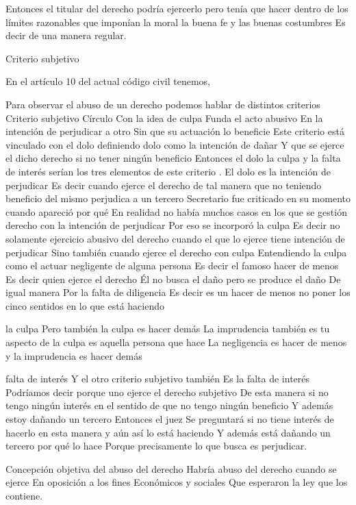 \documentclass[12pt]{book}
\begin{document}
Entonces el titular del derecho podría ejercerlo pero tenía que hacer dentro de los límites razonables que imponían la moral la buena fe y las buenas costumbres Es decir de una manera regular.


Criterio subjetivo

En el artículo 10 del actual código civil tenemos,

Para observar el abuso de un derecho podemos hablar de distintos criterios  Criterio subjetivo  Círculo Con la idea de culpa Funda el acto abusivo En la intención de perjudicar a otro 	Sin que su actuación lo beneficie Este criterio está vinculado con el dolo definiendo dolo como la intención de dañar Y que se ejerce el dicho derecho si no tener ningún beneficio Entonces el dolo la culpa y la falta de interés serían los tres elementos de este criterio .
El dolo 
es la intención de perjudicar Es decir cuando ejerce el derecho de tal manera que no teniendo beneficio del mismo perjudica a un tercero Secretario fue criticado en su momento cuando apareció por qué En realidad no había muchos casos en los que se gestión derecho con la intención de perjudicar Por eso se incorporó la culpa Es decir no solamente ejercicio abusivo del derecho cuando el que lo ejerce tiene intención de perjudicar Sino también cuando ejerce el derecho con culpa Entendiendo la culpa como el actuar negligente de alguna persona Es decir el famoso hacer de menos Es decir quien ejerce el derecho Él no busca el daño pero se produce el daño De igual manera Por la falta de diligencia Es decir es un hacer de menos no poner los cinco sentidos en lo que está haciendo 

la culpa
Pero también la culpa es hacer demás La imprudencia también es tu aspecto de la culpa es aquella persona que hace La negligencia es hacer de menos y la imprudencia es hacer demás

falta de interés
Y el otro criterio subjetivo también Es la falta de interés Podríamos decir porque uno ejerce el derecho subjetivo De esta manera si no tengo ningún interés en el sentido de que no tengo ningún beneficio Y además estoy dañando un tercero Entonces el juez Se preguntará si no tiene interés de hacerlo en esta manera y aún así lo está haciendo Y además está dañando un tercero por qué lo hace Porque precisamente lo que busca es perjudicar.


Concepción objetiva del abuso del derecho Habría abuso del derecho cuando se ejerce En oposición a los fines Económicos y sociales Que esperaron la ley que los contiene.
\end{document}
